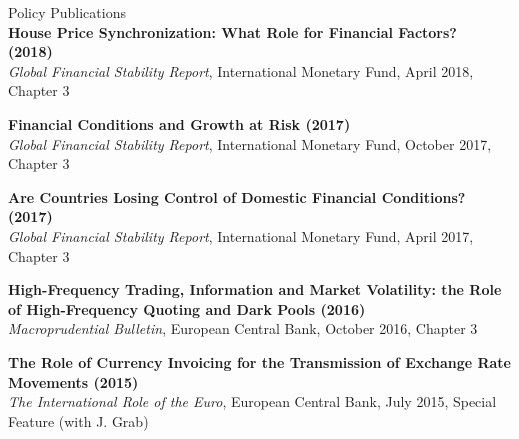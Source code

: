 \documentclass[usegeometry, 10pt, a4paper]{cv} %
\newcommand{\activite}[1]{\textbf{#1}\ }
\begin{document}
\begin{rubriquetableau}[0.95\textwidth]{Policy Publications}\\
  
\small
\activite{House Price Synchronization: What Role for Financial Factors? (2018)} \\
\hspace{0.6cm} \small{\emph{Global Financial Stability Report}, International Monetary Fund, April
  2018, Chapter 3}
\vspace{0.4cm} 

\small
\activite{Financial Conditions and Growth at Risk (2017)} \\
\hspace{0.6cm} \small{\emph{Global Financial Stability Report}, International Monetary Fund, October
  2017, Chapter 3}
\vspace{0.4cm} 

\small
\activite{Are Countries Losing Control of Domestic Financial Conditions? (2017)} \\
\hspace{0.6cm} \small{\emph{Global Financial Stability Report}, International Monetary Fund, April
  2017, Chapter 3}
\vspace{0.4cm} 

\small
\activite{High-Frequency Trading, Information and Market Volatility: the Role of High-Frequency
  Quoting and Dark Pools (2016)} \\
\hspace{0.6cm} \small{\emph{Macroprudential Bulletin}, European Central Bank, October 2016, Chapter 3}
\vspace{0.4cm} 

\small
\activite{The Role of Currency Invoicing for the Transmission of Exchange Rate Movements (2015)} \\
\hspace{0.6cm} \small{\emph{The International Role of the Euro}, European Central Bank, July 2015, Special Feature (with J. Grab)}
\end{rubriquetableau}


\newpage


\end{document}
